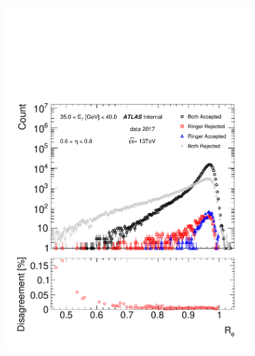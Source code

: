 \begin{figure}[h!]
\begin{subfigure}[c]{.49\textwidth}
\includegraphics[width=\textwidth]{sections/04_analysis/figures/quadrant_plots/rphi.pdf}
\caption{}
\end{subfigure} 
\begin{subfigure}[c]{.49\textwidth}
\centering

\end{subfigure}
\end{figure}
